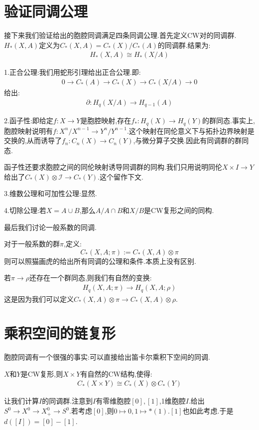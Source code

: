 \section{验证同调公理}
接下来我们验证给出的胞腔同调满足四条同调公理.首先定义CW对的同调群.$H_*(X,A)$定义为$C_*(X,A)=C_*(X)/C_*(A)$的同调群.结果为:
\begin{align*}
    H_*(X,A)\cong H_*(X/A)
\end{align*}

1.正合公理:我们用蛇形引理给出正合公理.即:
\begin{align*}
    0 \to C_*(A) \to C_*(X) \to C_*(X/A) \to 0
\end{align*}
给出:
\begin{align*}
    \partial:H_q(X/A) \to H_{q-1}(A)
\end{align*}

2.函子性:即给定$f:X \to Y$是胞腔映射,存在$f_*:H_q(X)\to H_q(Y)$的群同态.事实上,胞腔映射说明有$f:X^n/X^{n-1} \to Y^n/Y^{n-1}$.这个映射在同伦意义下与拓扑边界映射是交换的,从而诱导了$f_n:C_n(X)\to C_n(Y)$,与微分算子交换.因此有同调群的群同态.

函子性还要求胞腔之间的同伦映射诱导同调群的同构.我们只用说明同伦$X \times I \to Y$给出了$C_*(X) \otimes \mathscr{I} \to C_*(Y)$.这个留作下文.

3.维数公理和可加性公理:显然.

4.切除公理:若$X =A \cup B$,那么$A/A\cap B$和$X/B$是CW复形之间的同构.

最后我们讨论一般系数的同调.
\begin{definition}
    对于一般系数的群$\pi$,定义:
    $$
    C_*(X,A;\pi):=C_*(X,A) \otimes \pi
    $$
    则可以照猫画虎的给出所有同调的公理和条件.本质上没有区别.
\end{definition}
若$\pi \to \rho$还存在一个群同态,则我们有自然的变换:
\begin{align*}
    H_q(X,A;\pi) \to H_q(X,A;\rho)
\end{align*}
这是因为我们可以定义$C_*(X,A) \otimes \pi \to C_*(X,A) \otimes \rho$.
\section{乘积空间的链复形}
胞腔同调有一个很强的事实:可以直接给出笛卡尔乘积下空间的同调.
\begin{theorem}
    $X$和$Y$是CW复形,则$X \times Y$有自然的CW结构,使得:
    \begin{align*}
        C_*(X \times Y) \cong C_*(X) \otimes C_*(Y)
    \end{align*}
\end{theorem}
让我们计算$I$的同调群.注意到$I$有零维胞腔$[0],[1]$,1维胞腔$I$.给出$S^0 \to X^0 \to X^0_+ \to S^0$.若考虑$[0]$,则$0 \mapsto 0,1 \mapsto *(1)$.$[1]$也如此考虑.于是$d([I])=[0]-[1]$.

